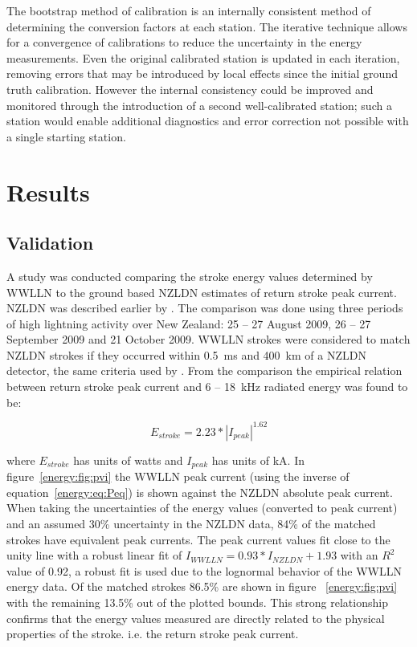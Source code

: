 The bootstrap method of calibration is an internally consistent method of determining the conversion factors at each station.
The iterative technique allows for a convergence of calibrations to reduce the uncertainty in the energy measurements.
Even the original calibrated station is updated in each iteration, removing errors that may be introduced by local effects since the initial ground truth calibration.
However the internal consistency could be improved and monitored through the introduction of a second well-calibrated station; such a station would enable additional diagnostics and error correction not possible with a single starting station.

\section{Results}

\subsection{Validation}

A study was conducted comparing the stroke energy values determined by WWLLN to the ground based NZLDN estimates of return stroke peak current.
NZLDN was described earlier by \citet{Rodger2006}.
The comparison was done using three periods of high lightning activity over New Zealand: 25 -- 27 August 2009, 26 -- 27 September 2009 and 21 October 2009.
WWLLN strokes were considered to match NZLDN strokes if they occurred within 0.5~ms and 400~km of a NZLDN detector, the same criteria used by \citet{Rodger2006}.
From the comparison the empirical relation between return stroke peak current and 6 -- 18~kHz radiated energy was found to be: 

\begin{equation}
E_{stroke} = 2.23 * |I_{peak}|^{1.62}
\label{energy:eq:Peq}
\end{equation}

where $E_{stroke}$ has units of watts and $I_{peak}$ has units of kA.
In figure~\ref{energy:fig:pvi} the WWLLN peak current (using the inverse of equation~\ref{energy:eq:Peq}) is shown against the NZLDN absolute peak current.
When taking the uncertainties of the energy values (converted to peak current) and an assumed 30\% uncertainty in the NZLDN data, 84\% of the matched strokes have equivalent peak currents.
The peak current values fit close to the unity line with a robust linear fit of $I_{WWLLN}=0.93*I_{NZLDN}+1.93$ with an $R^2$ value of 0.92, a robust fit is used due to the lognormal behavior of the WWLLN energy data.
Of the matched strokes 86.5\% are shown in figure~ \ref{energy:fig:pvi} with the remaining 13.5\% out of the plotted bounds.
This strong relationship confirms that the energy values measured are directly related to the physical properties of the stroke. i.e. the return stroke peak current.

